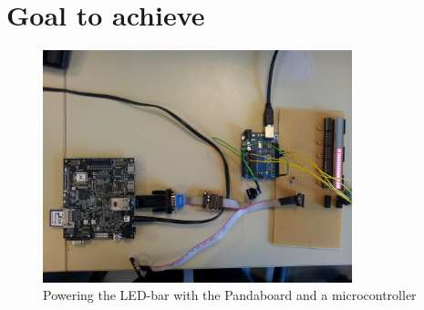 \section{Goal to achieve}
\begin{figure}[H]
   \centering
   \includegraphics[width=0.8\textwidth]{img/Panda_and_LED_Bar.jpg}%
   \caption{Powering the LED-bar with the Pandaboard and a microcontroller}
   \label{fig:completeProject}%
\end{figure}
